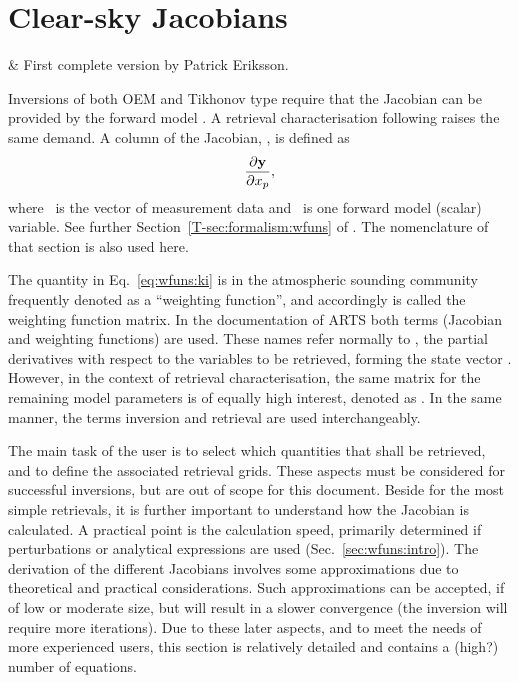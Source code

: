 \chapter{Clear-sky Jacobians}
 \label{sec:wfuns}

  & First complete version by Patrick Eriksson.\\
 \stophistory

\graphicspath{{Figs/wfuns/}}


Inversions of both OEM and Tikhonov type require that the Jacobian can be
provided by the forward model \citep[see e.g.][]{eriksson:analy:00}. A
retrieval characterisation following \citet{rodgers:90,rodgers:00} raises the
same demand. A column of the Jacobian, \aWfnMtr{\SttVct}, is defined as
\begin{equation}
  \frac{\partial\mathbf{y}}{\partial x_{p}},
  \label{eq:wfuns:ki}
\end{equation}
where \MsrVct\ is the vector of measurement data and \ is one forward
model (scalar) variable. See further Section~\ref{T-sec:formalism:wfuns} of
\theory. The nomenclature of that section is also used here.

The quantity in Eq.~\ref{eq:wfuns:ki} is in the atmospheric sounding
community frequently denoted as a ``weighting function'', and accordingly
\aWfnMtr{\SttVct} is called the weighting function matrix. In the documentation
of ARTS both terms (Jacobian and weighting functions) are used. These names
refer normally to \aWfnMtr{\SttVct}, the partial derivatives with respect to
the variables to be retrieved, forming the state vector \SttVct. However, in
the context of retrieval characterisation, the same matrix for the remaining
model parameters is of equally high interest, denoted as \aWfnMtr{\FrwMdlVct}.
In the same manner, the terms inversion and retrieval are used interchangeably.

The main task of the user is to select which quantities that shall be
retrieved, and to define the associated retrieval grids. These aspects must be
considered for successful inversions, but are out of scope for this document.
Beside for the most simple retrievals, it is further important to understand
how the Jacobian is calculated. A practical point is the calculation speed,
primarily determined if perturbations or analytical expressions are used
(Sec.~\ref{sec:wfuns:intro}). The derivation of the different Jacobians
involves some approximations due to theoretical and practical considerations.
Such approximations can be accepted, if of low or moderate size, but will
result in a slower convergence (the inversion will require more iterations).
Due to these later aspects, and to meet the needs of more experienced users,
this section is relatively detailed and contains a (high?) number of equations.


